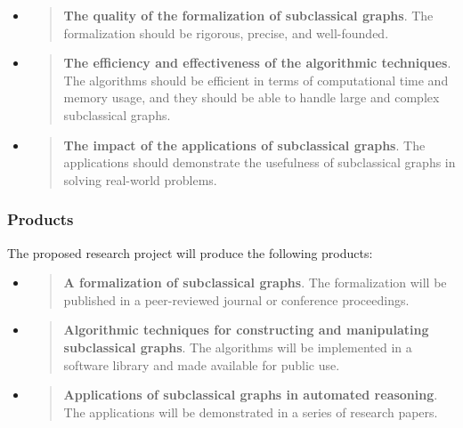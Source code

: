 \begin{itemize}
\item
  \begin{quote}
  \textbf{The quality of the formalization of subclassical graphs}. The
  formalization should be rigorous, precise, and well-founded.
  \end{quote}
\item
  \begin{quote}
  \textbf{The efficiency and effectiveness of the algorithmic
  techniques}. The algorithms should be efficient in terms of
  computational time and memory usage, and they should be able to handle
  large and complex subclassical graphs.
  \end{quote}
\item
  \begin{quote}
  \textbf{The impact of the applications of subclassical graphs}. The
  applications should demonstrate the usefulness of subclassical graphs
  in solving real-world problems.
  \end{quote}
\end{itemize}

\hypertarget{products}{%
\subsubsection{Products}\label{products}}

The proposed research project will produce the following products:

\begin{itemize}
\item
  \begin{quote}
  \textbf{A formalization of subclassical graphs}. The formalization
  will be published in a peer-reviewed journal or conference
  proceedings.
  \end{quote}
\item
  \begin{quote}
  \textbf{Algorithmic techniques for constructing and manipulating
  subclassical graphs}. The algorithms will be implemented in a software
  library and made available for public use.
  \end{quote}
\item
  \begin{quote}
  \textbf{Applications of subclassical graphs in automated reasoning}.
  The applications will be demonstrated in a series of research papers.
  \end{quote}
\end{itemize}

